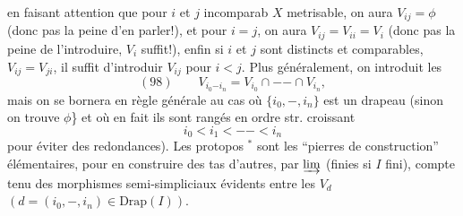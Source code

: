 
en faisant attention que pour $i$ et $j$ incomparab  $X$ metrisable, on  aura $V_{ij}=\phi$  (donc pas la peine d'en parler!), et pour $i=j$, on aura $V_{ij}=V_{ii}=V_i$ (donc pas la peine de l'introduire, $V_i$ suffit!), enfin  si $i$ et $j$ sont distincts et comparables,   $V_{ij}=V_{ji}$, il suffit d'introduir $V_{ij}$ pour  $i<j$. Plus généralement, on introduit les
\[(98)\qquad V_{i_0\mathord{-}i_n}=V_{i_0}\cap\mathord{-}\mathord{-}\cap V_{i_n},\]
mais on se bornera en règle générale au cas où $\{i_0,\mathord{-},i_n\}$ est un drapeau (sinon on trouve $\phi$\} et où en fait ils sont rangés en ordre str. croissant
\[i_0<i_1<\mathord{-}\mathord{-}<i_n\]
\unsure{(}pour éviter des redondances). Les protopos $^*$ sont les ``pierres de construction'' élémentaires, pour en construire des tas d'autres, par $\varinjlim$ (finies si $I$ fini), compte tenu des morphismes semi-simpliciaux évidents entre les $V_d$ $(d=(i_0,\mathord{-},i_n)\in\mathrm{Drap}(I))$.

